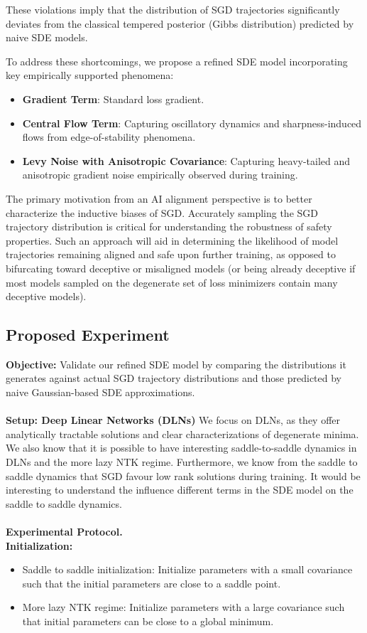 \documentclass[11pt]{article}
\begin{document}
These violations imply that the distribution of SGD trajectories significantly deviates from the classical tempered posterior (Gibbs distribution) predicted by naive SDE models.

To address these shortcomings, we propose a refined SDE model incorporating key empirically supported phenomena:

\begin{itemize}
\item \textbf{Gradient Term}: Standard loss gradient.
\item \textbf{Central Flow Term}: Capturing oscillatory dynamics and sharpness-induced flows from edge-of-stability phenomena.
\item \textbf{Levy Noise with Anisotropic Covariance}: Capturing heavy-tailed and anisotropic gradient noise empirically observed during training.
\end{itemize}

The primary motivation from an AI alignment perspective is to better characterize the inductive biases of SGD. Accurately sampling the SGD trajectory distribution is critical for understanding the robustness of safety properties. Such an approach will aid in determining the likelihood of model trajectories remaining aligned and safe upon further training, as opposed to bifurcating toward deceptive or misaligned models (or being already deceptive if most models sampled on the degenerate set of loss minimizers contain many deceptive models).

\subsection{Proposed Experiment}

\textbf{Objective:} Validate our refined SDE model by comparing the distributions it generates against actual SGD trajectory distributions and those predicted by naive Gaussian-based SDE approximations.
\\
\\
\textbf{Setup: Deep Linear Networks (DLNs)}
We focus on DLNs, as they offer analytically tractable solutions and clear characterizations of degenerate minima. We also know that it is possible to have interesting saddle-to-saddle dynamics in DLNs and the more lazy NTK regime. Furthermore, we know from the saddle to saddle dynamics that SGD favour low rank solutions during training. It would be interesting to understand the influence different terms in the SDE model on the saddle to saddle dynamics.
\\
\\
\textbf{Experimental Protocol.}
\\
\textbf{Initialization:}
\begin{itemize}
\item Saddle to saddle initialization: Initialize parameters with a small covariance such that the initial parameters are close to a saddle point.
\item More lazy NTK regime: Initialize parameters with a large covariance such that initial parameters can be close to a global minimum.
\end{itemize}
\end{document}
